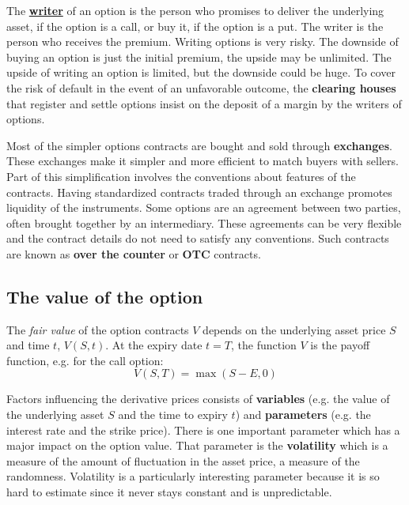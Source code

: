 The \href{http://positron-investments.com/en/options-basics/option-buyer-vs-option-writer/}{\textbf{writer}} of an option is the person who promises to deliver the underlying asset, if the option is a call, or buy it, if the option is a put. The writer is the person who receives the premium. Writing options is very risky. The downside of buying an option is just the initial premium, the upside may be unlimited. The upside of writing an option is limited, but the downside could be huge. To cover the risk of default in the event of an unfavorable outcome, the \textbf{clearing houses} that register and settle options insist on the deposit of a margin by the writers of options.

Most of the simpler options contracts are bought and sold through \textbf{exchanges}. These exchanges make it simpler and more efficient to match buyers with sellers. Part of this simplification involves the conventions about features of the contracts. Having standardized contracts traded through an exchange promotes liquidity of the instruments. Some options are an agreement between two parties, often brought together by an intermediary. These agreements can be very flexible and the contract details do not need to satisfy any conventions. Such contracts are known as \textbf{over the counter} or \textbf{OTC} contracts.


\subsection{The value of the option}
The \textit{fair value} of the option contracts $V$ depends on the underlying asset price $S$ and time $t$, $V(S,t)$. At the expiry date $t = T$, the function $V$ is the payoff function, e.g. for the call option:
\begin{equation}
    V(S,T) = \max(S - E, 0)
\end{equation}    

Factors influencing the derivative prices consists of \textbf{variables} (e.g. the value of the underlying asset $S$ and the time to expiry $t$) and \textbf{parameters} (e.g. the interest rate and the strike price). There is one important parameter which has a major impact on the option value. That parameter is the \textbf{volatility} which is a measure of the amount of fluctuation in the asset price, a measure of the randomness. Volatility is a particularly interesting parameter because it is so hard to estimate since it never stays constant and is unpredictable.


